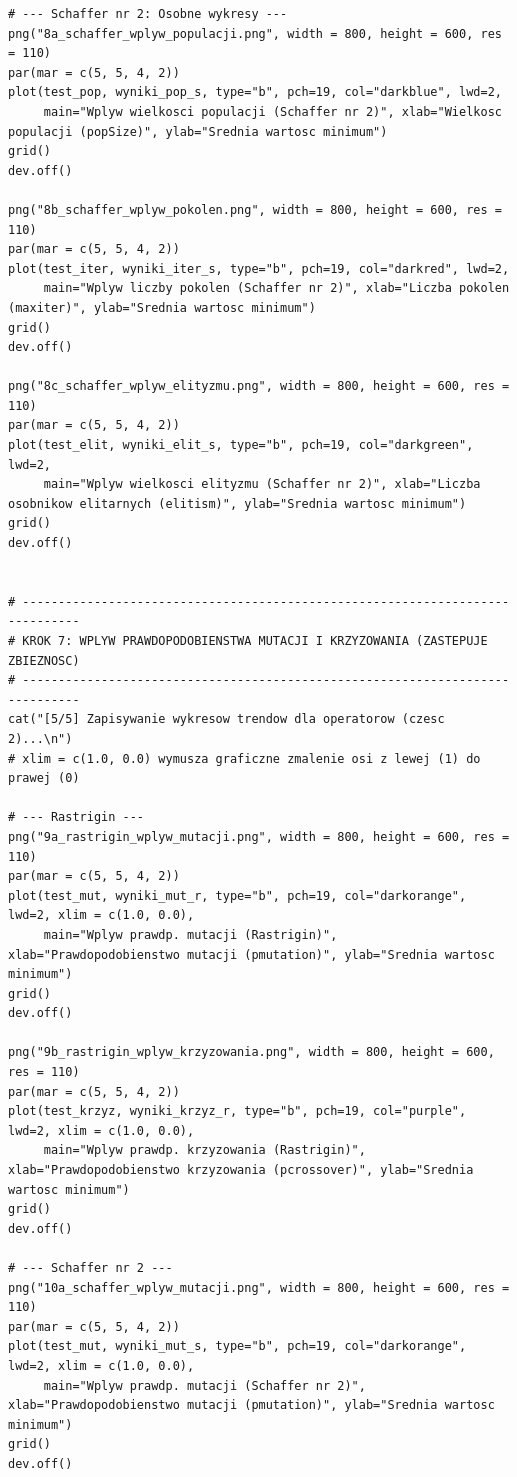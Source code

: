 \documentclass[a4paper,12pt]{article}
\begin{document}
\begin{lstlisting}
# --- Schaffer nr 2: Osobne wykresy ---
png("8a_schaffer_wplyw_populacji.png", width = 800, height = 600, res = 110)
par(mar = c(5, 5, 4, 2))
plot(test_pop, wyniki_pop_s, type="b", pch=19, col="darkblue", lwd=2, 
     main="Wplyw wielkosci populacji (Schaffer nr 2)", xlab="Wielkosc populacji (popSize)", ylab="Srednia wartosc minimum")
grid()
dev.off()

png("8b_schaffer_wplyw_pokolen.png", width = 800, height = 600, res = 110)
par(mar = c(5, 5, 4, 2))
plot(test_iter, wyniki_iter_s, type="b", pch=19, col="darkred", lwd=2, 
     main="Wplyw liczby pokolen (Schaffer nr 2)", xlab="Liczba pokolen (maxiter)", ylab="Srednia wartosc minimum")
grid()
dev.off()

png("8c_schaffer_wplyw_elityzmu.png", width = 800, height = 600, res = 110)
par(mar = c(5, 5, 4, 2))
plot(test_elit, wyniki_elit_s, type="b", pch=19, col="darkgreen", lwd=2, 
     main="Wplyw wielkosci elityzmu (Schaffer nr 2)", xlab="Liczba osobnikow elitarnych (elitism)", ylab="Srednia wartosc minimum")
grid()
dev.off()


# ------------------------------------------------------------------------------
# KROK 7: WPLYW PRAWDOPODOBIENSTWA MUTACJI I KRZYZOWANIA (ZASTEPUJE ZBIEZNOSC)
# ------------------------------------------------------------------------------
cat("[5/5] Zapisywanie wykresow trendow dla operatorow (czesc 2)...\n")
# xlim = c(1.0, 0.0) wymusza graficzne zmalenie osi z lewej (1) do prawej (0)

# --- Rastrigin ---
png("9a_rastrigin_wplyw_mutacji.png", width = 800, height = 600, res = 110)
par(mar = c(5, 5, 4, 2))
plot(test_mut, wyniki_mut_r, type="b", pch=19, col="darkorange", lwd=2, xlim = c(1.0, 0.0),
     main="Wplyw prawdp. mutacji (Rastrigin)", xlab="Prawdopodobienstwo mutacji (pmutation)", ylab="Srednia wartosc minimum")
grid()
dev.off()

png("9b_rastrigin_wplyw_krzyzowania.png", width = 800, height = 600, res = 110)
par(mar = c(5, 5, 4, 2))
plot(test_krzyz, wyniki_krzyz_r, type="b", pch=19, col="purple", lwd=2, xlim = c(1.0, 0.0),
     main="Wplyw prawdp. krzyzowania (Rastrigin)", xlab="Prawdopodobienstwo krzyzowania (pcrossover)", ylab="Srednia wartosc minimum")
grid()
dev.off()

# --- Schaffer nr 2 ---
png("10a_schaffer_wplyw_mutacji.png", width = 800, height = 600, res = 110)
par(mar = c(5, 5, 4, 2))
plot(test_mut, wyniki_mut_s, type="b", pch=19, col="darkorange", lwd=2, xlim = c(1.0, 0.0),
     main="Wplyw prawdp. mutacji (Schaffer nr 2)", xlab="Prawdopodobienstwo mutacji (pmutation)", ylab="Srednia wartosc minimum")
grid()
dev.off()


\end{lstlisting}
\end{document}
